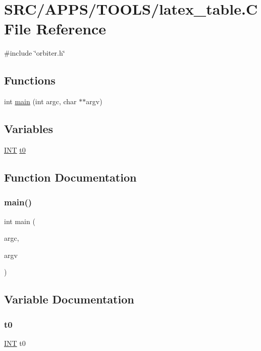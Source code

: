 \hypertarget{latex__table_8_c}{}\section{S\+R\+C/\+A\+P\+P\+S/\+T\+O\+O\+L\+S/latex\+\_\+table.C File Reference}
\label{latex__table_8_c}
{\ttfamily \#include \char`\"{}orbiter.\+h\char`\"{}}\newline
\subsection*{Functions}
\begin{DoxyCompactItemize}
\item 
int \mbox{\hyperlink{latex__table_8_c_a3c04138a5bfe5d72780bb7e82a18e627}{main}} (int argc, char $\ast$$\ast$argv)
\end{DoxyCompactItemize}
\subsection*{Variables}
\begin{DoxyCompactItemize}
\item 
\mbox{\hyperlink{galois_8h_a09fddde158a3a20bd2dcadb609de11dc}{I\+NT}} \mbox{\hyperlink{latex__table_8_c_a4268f4fe222ffb119218a0199f5e1904}{t0}}
\end{DoxyCompactItemize}


\subsection{Function Documentation}
\mbox{\label{latex__table_8_c_a3c04138a5bfe5d72780bb7e82a18e627}} 
\subsubsection{\texorpdfstring{main()}{main()}}
{\footnotesize\ttfamily int main (\begin{DoxyParamCaption}\item[{int}]{argc,  }\item[{char $\ast$$\ast$}]{argv }\end{DoxyParamCaption})}



\subsection{Variable Documentation}
\mbox{\label{latex__table_8_c_a4268f4fe222ffb119218a0199f5e1904}} 
\subsubsection{\texorpdfstring{t0}{t0}}
{\footnotesize\ttfamily \mbox{\hyperlink{galois_8h_a09fddde158a3a20bd2dcadb609de11dc}{I\+NT}} t0}

